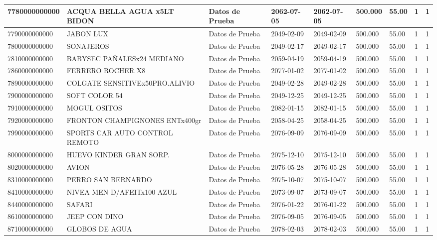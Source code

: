 \documentclass[a4paper,12pt]{article}
\begin{document}
\begin{landscape}
\begin{longtable}{|p{4cm}|p{2.5cm}|p{2.5cm}|p{1.8cm}|p{1.8cm}|p{1cm}|p{1cm}|p{3cm}|p{3cm}||}
7780000000000 & ACQUA BELLA AGUA x5LT BIDON & Datos de Prueba & 2062-07-05 & 2062-07-05 & 500.000 & 55.00 & 1 & 1 \\ \hline 
7790000000000 & JABON LUX & Datos de Prueba & 2049-02-09 & 2049-02-09 & 500.000 & 55.00 & 1 & 1 \\ \hline 
7800000000000 & SONAJEROS & Datos de Prueba & 2049-02-17 & 2049-02-17 & 500.000 & 55.00 & 1 & 1 \\ \hline 
7810000000000 & BABYSEC PAÑALESx24 MEDIANO & Datos de Prueba & 2059-04-19 & 2059-04-19 & 500.000 & 55.00 & 1 & 1 \\ \hline 
7860000000000 & FERRERO ROCHER X8 & Datos de Prueba & 2077-01-02 & 2077-01-02 & 500.000 & 55.00 & 1 & 1 \\ \hline 
7890000000000 & COLGATE SENSITIVEx50PRO.ALIVIO & Datos de Prueba & 2049-02-28 & 2049-02-28 & 500.000 & 55.00 & 1 & 1 \\ \hline 
7900000000000 & SOFT COLOR 54 & Datos de Prueba & 2049-12-25 & 2049-12-25 & 500.000 & 55.00 & 1 & 1 \\ \hline 
7910000000000 & MOGUL OSITOS & Datos de Prueba & 2082-01-15 & 2082-01-15 & 500.000 & 55.00 & 1 & 1 \\ \hline 
7920000000000 & FRONTON CHAMPIGNONES ENTx400gr & Datos de Prueba & 2058-04-25 & 2058-04-25 & 500.000 & 55.00 & 1 & 1 \\ \hline 
7990000000000 & SPORTS CAR AUTO CONTROL REMOTO & Datos de Prueba & 2076-09-09 & 2076-09-09 & 500.000 & 55.00 & 1 & 1 \\ \hline 
8000000000000 & HUEVO KINDER GRAN SORP. & Datos de Prueba & 2075-12-10 & 2075-12-10 & 500.000 & 55.00 & 1 & 1 \\ \hline 
8020000000000 & AVION & Datos de Prueba & 2076-05-28 & 2076-05-28 & 500.000 & 55.00 & 1 & 1 \\ \hline 
8310000000000 & PERRO SAN BERNARDO & Datos de Prueba & 2075-10-07 & 2075-10-07 & 500.000 & 55.00 & 1 & 1 \\ \hline 
8410000000000 & NIVEA MEN D/AFEITx100 AZUL & Datos de Prueba & 2073-09-07 & 2073-09-07 & 500.000 & 55.00 & 1 & 1 \\ \hline 
8440000000000 & SAFARI & Datos de Prueba & 2076-01-22 & 2076-01-22 & 500.000 & 55.00 & 1 & 1 \\ \hline 
8610000000000 & JEEP CON DINO & Datos de Prueba & 2076-09-05 & 2076-09-05 & 500.000 & 55.00 & 1 & 1 \\ \hline 
8710000000000 & GLOBOS DE AGUA & Datos de Prueba & 2078-02-03 & 2078-02-03 & 500.000 & 55.00 & 1 & 1 \\ \hline 

\end{longtable}
\end{landscape}
\end{document}
